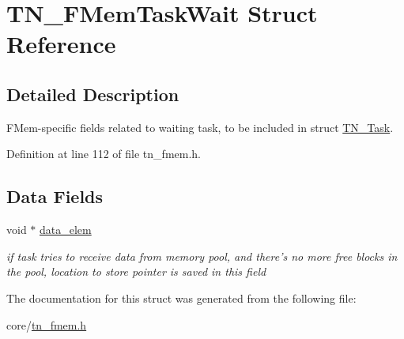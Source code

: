 \hypertarget{structTN__FMemTaskWait}{\section{T\+N\+\_\+\+F\+Mem\+Task\+Wait Struct Reference}
\label{structTN__FMemTaskWait}
}


\subsection{Detailed Description}
F\+Mem-\/specific fields related to waiting task, to be included in struct \hyperlink{structTN__Task}{T\+N\+\_\+\+Task}. 

Definition at line 112 of file tn\+\_\+fmem.\+h.

\subsection*{Data Fields}
\begin{DoxyCompactItemize}
\item 
\hypertarget{structTN__FMemTaskWait_a68632560b260859d863fbd3fc24b0506}{void $\ast$ \hyperlink{structTN__FMemTaskWait_a68632560b260859d863fbd3fc24b0506}{data\+\_\+elem}}\label{structTN__FMemTaskWait_a68632560b260859d863fbd3fc24b0506}

\begin{DoxyCompactList}\small\item\em if task tries to receive data from memory pool, and there's no more free blocks in the pool, location to store pointer is saved in this field \end{DoxyCompactList}\end{DoxyCompactItemize}


The documentation for this struct was generated from the following file\+:\begin{DoxyCompactItemize}
\item 
core/\hyperlink{tn__fmem_8h}{tn\+\_\+fmem.\+h}\end{DoxyCompactItemize}
